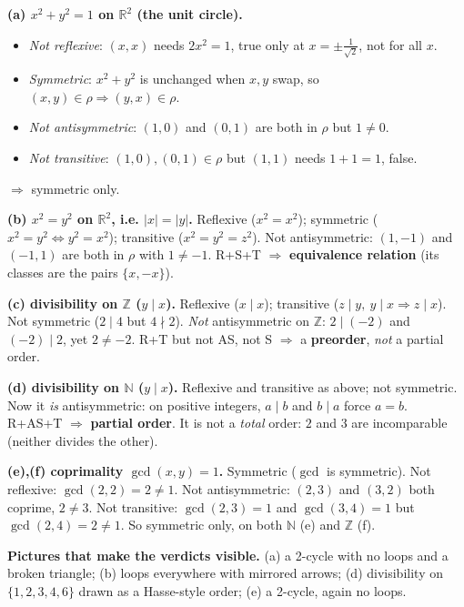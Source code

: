 \documentclass[11pt,a4paper]{article}
\newcommand{\Z}{\mathbb{Z}}
\newcommand{\R}{\mathbb{R}}
\newcommand{\N}{\mathbb{N}}
\begin{document}
\textbf{(a) $x^2+y^2=1$ on $\R^2$ (the unit circle).}
\begin{itemize}[leftmargin=1.4em,nosep]
\item \emph{Not reflexive}: $(x,x)$ needs $2x^2=1$, true only at $x=\pm\tfrac1{\sqrt2}$, not for all $x$.
\item \emph{Symmetric}: $x^2+y^2$ is unchanged when $x,y$ swap, so $(x,y)\in\rho\Rightarrow(y,x)\in\rho$.
\item \emph{Not antisymmetric}: $(1,0)$ and $(0,1)$ are both in $\rho$ but $1\neq0$.
\item \emph{Not transitive}: $(1,0),(0,1)\in\rho$ but $(1,1)$ needs $1+1=1$, false.
\end{itemize}
$\Rightarrow$ symmetric only.

\textbf{(b) $x^2=y^2$ on $\R^2$, i.e. $|x|=|y|$.}
Reflexive ($x^2=x^2$); symmetric ($x^2=y^2\iff y^2=x^2$); transitive ($x^2=y^2=z^2$). Not
antisymmetric: $(1,-1)$ and $(-1,1)$ are both in $\rho$ with $1\neq-1$. R+S+T $\Rightarrow$
\textbf{equivalence relation} (its classes are the pairs $\{x,-x\}$).

\textbf{(c) divisibility on $\Z$ ($y\mid x$).}
Reflexive ($x\mid x$); transitive ($z\mid y,\ y\mid x\Rightarrow z\mid x$). Not symmetric
($2\mid 4$ but $4\nmid 2$). \emph{Not} antisymmetric on $\Z$: $2\mid(-2)$ and $(-2)\mid2$, yet
$2\neq-2$. R+T but not AS, not S $\Rightarrow$ a \textbf{preorder}, \emph{not} a partial order.

\textbf{(d) divisibility on $\N$ ($y\mid x$).}
Reflexive and transitive as above; not symmetric. Now it \emph{is} antisymmetric: on positive
integers, $a\mid b$ and $b\mid a$ force $a=b$. R+AS+T $\Rightarrow$ \textbf{partial order}. It is not
a \emph{total} order: $2$ and $3$ are incomparable (neither divides the other).

\textbf{(e),(f) coprimality $\gcd(x,y)=1$.}
Symmetric ($\gcd$ is symmetric). Not reflexive: $\gcd(2,2)=2\neq1$. Not antisymmetric: $(2,3)$ and
$(3,2)$ both coprime, $2\neq3$. Not transitive: $\gcd(2,3)=1$ and $\gcd(3,4)=1$ but $\gcd(2,4)=2\neq1$.
So symmetric only, on both $\N$ (e) and $\Z$ (f).

\textbf{Pictures that make the verdicts visible.} (a) a 2-cycle with no loops and a broken triangle;
(b) loops everywhere with mirrored arrows; (d) divisibility on $\{1,2,3,4,6\}$ drawn as a Hasse-style
order; (e) a 2-cycle, again no loops.
\end{document}
